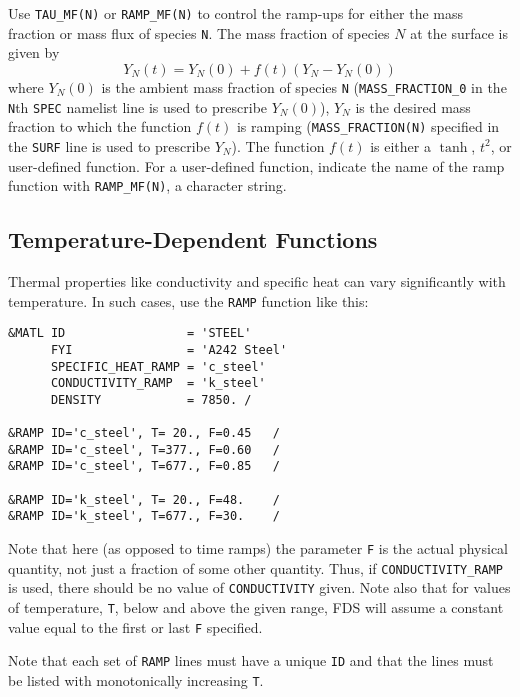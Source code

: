 \documentclass[11pt]{book}
\newcommand{\ct}{\tt\small}
\begin{document}
Use {\ct TAU\_MF(N)} or {\ct RAMP\_MF(N)}
to control the ramp-ups for either the mass
fraction or mass flux of species {\ct N}.
The mass fraction of species $N$ at the surface is given by
$$ Y_N(t) = Y_N(0) + f(t) \left( Y_N - Y_N(0) \right) $$
where $Y_N(0)$ is the ambient mass fraction of species {\ct N}
({\ct MASS\_FRACTION\_0} in
the {\ct N}th {\ct SPEC} namelist line is used to prescribe $Y_N(0)$),
$Y_N$ is the desired mass fraction to
which the function $f(t)$ is ramping ({\ct MASS\_FRACTION(N)}
specified in the {\ct SURF} line is used to prescribe $Y_N$).
The function $f(t)$ is either
a $\tanh$, $t^2$, or user-defined function. For a user-defined
function, indicate the name of the ramp function with {\ct RAMP\_MF(N)},
a character string.


\subsection{Temperature-Dependent Functions}

Thermal properties like conductivity and specific heat can vary significantly with temperature. In such cases, use
the {\ct RAMP} function like this:

\footnotesize
\begin{verbatim}
&MATL ID                 = 'STEEL'
      FYI                = 'A242 Steel'
      SPECIFIC_HEAT_RAMP = 'c_steel'
      CONDUCTIVITY_RAMP  = 'k_steel'
      DENSITY            = 7850. /

&RAMP ID='c_steel', T= 20., F=0.45   /
&RAMP ID='c_steel', T=377., F=0.60   /
&RAMP ID='c_steel', T=677., F=0.85   /

&RAMP ID='k_steel', T= 20., F=48.    /
&RAMP ID='k_steel', T=677., F=30.    /
\end{verbatim}
\normalsize

\noindent
Note that here (as opposed to time ramps) the parameter {\ct F} is the actual physical quantity, not just
a fraction of some other quantity. Thus, if {\ct CONDUCTIVITY\_RAMP} is used, there should be no
value of {\ct CONDUCTIVITY} given. Note also that for values of temperature, {\ct T}, below and above the
given range, FDS will assume a constant value equal to the first or last {\ct F} specified.

\begin{warning}
\noindent
Note that each set of {\ct RAMP} lines must have a unique {\ct ID} and that the lines must
be listed with monotonically increasing {\ct T}.
\end{warning}
\end{document}
